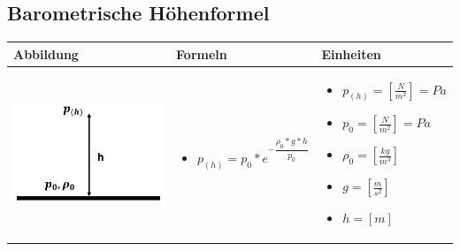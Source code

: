 \subsection{Barometrische Höhenformel}				%
\begin{table}[h!]
	\begin{tabular}{ | m{6cm} | m{6cm} | m{6cm} | }
		\hline
		Abbildung & Formeln & Einheiten \\ \hline
		\midrule
		\begin{minipage}{.3\textwidth}
			\includegraphics[width=4.5cm]{Figures/barometrisch}
		\end{minipage}
		&
		\begin{itemize}
			\item $p_{(h)}=p_{0}*e^{-\dfrac{\rho_{0}*g*h}{p_{0}}}$
		\end{itemize}
		& 
		\begin{itemize}
			\item $p_{(h)}=[\frac{N}{m^2}]=Pa$
			\item $p_{0}=[\frac{N}{m^2}]=Pa$
			\item $\rho_{0}=[\frac{kg}{m^3}]$ 
			\item $g=[\frac{m}{s^2}]$ 	
			\item $h=[m]$ 				
		\end{itemize}
		\\ \hline
	\end{tabular}
\end{table}
	
	
